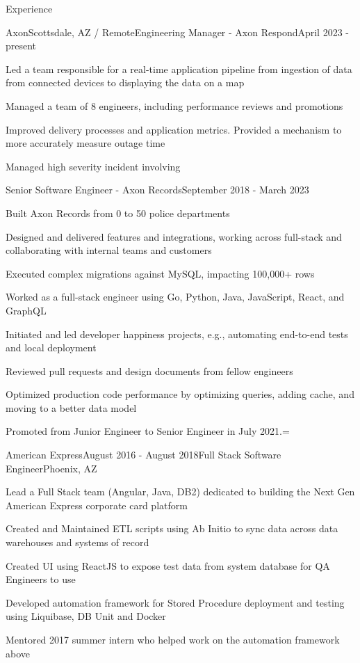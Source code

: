 \documentclass{resume} %
\begin{document}
\begin{rSection}{Experience}

\begin{rSubsection}{Axon}{Scottsdale, AZ / Remote}{Engineering Manager - Axon Respond}{April 2023 - present}
\item Led a team responsible for a real-time application pipeline from ingestion of data from connected devices to displaying the data on a map
\item Managed a team of 8 engineers, including performance reviews and promotions
\item Improved delivery processes and application metrics. Provided a mechanism to more accurately measure outage time
\item Managed high severity incident involving
\end{rSubsection}
	
\begin{rSubsection}{}{}{Senior Software Engineer - Axon Records}{September 2018 - March 2023}
\item Built Axon Records from 0 to 50 police departments
\item Designed and delivered features and integrations, working across full-stack and collaborating with internal teams and customers
\item Executed complex migrations against MySQL, impacting 100,000+ rows
\item Worked as a full-stack engineer using Go, Python, Java, JavaScript, React, and GraphQL
\item Initiated and led developer happiness projects, e.g., automating end-to-end tests and local deployment
\item Reviewed pull requests and design documents from fellow engineers
\item Optimized production code performance by optimizing queries, adding cache, and moving to a better data model
\item Promoted from Junior Engineer to Senior Engineer in July 2021.=
\end{rSubsection}

\begin{rSubsection}{American Express}{August 2016 - August 2018}{Full Stack Software Engineer}{Phoenix, AZ}
\item Lead a Full Stack team (Angular, Java, DB2) dedicated to building the Next Gen American Express corporate card platform
\item Created and Maintained ETL scripts using Ab Initio to sync data across data warehouses and systems of record
\item Created UI using ReactJS to expose test data from system database for QA Engineers to use
\item Developed automation framework for Stored Procedure deployment and testing using Liquibase, DB Unit and Docker
\item Mentored 2017 summer intern who helped work on the automation framework above


\end{rSubsection}
\end{rSection}
\end{document}
